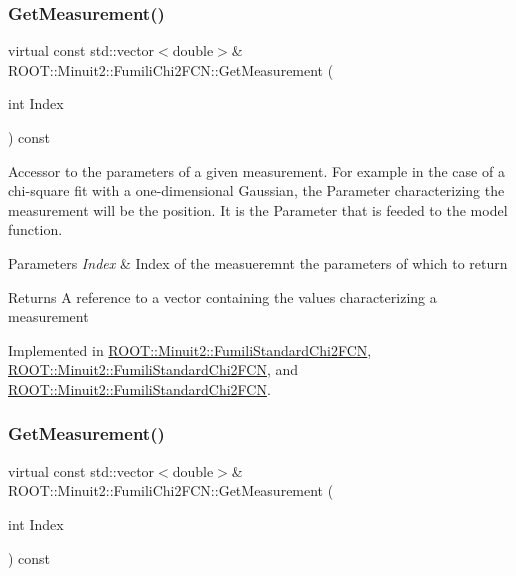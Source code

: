 \subsubsection{\texorpdfstring{GetMeasurement()}{GetMeasurement()}\hspace{0.1cm}{\footnotesize\ttfamily [2/3]}}
{\footnotesize\ttfamily virtual const std\+::vector$<$double$>$\& R\+O\+O\+T\+::\+Minuit2\+::\+Fumili\+Chi2\+F\+C\+N\+::\+Get\+Measurement (\begin{DoxyParamCaption}\item[{int}]{Index }\end{DoxyParamCaption}) const\hspace{0.3cm}{\ttfamily [pure virtual]}}

Accessor to the parameters of a given measurement. For example in the case of a chi-\/square fit with a one-\/dimensional Gaussian, the Parameter characterizing the measurement will be the position. It is the Parameter that is feeded to the model function.


\begin{DoxyParams}{Parameters}
{\em Index} & Index of the measueremnt the parameters of which to return \\
\hline
\end{DoxyParams}
\begin{DoxyReturn}{Returns}
A reference to a vector containing the values characterizing a measurement 
\end{DoxyReturn}


Implemented in \mbox{\hyperlink{classROOT_1_1Minuit2_1_1FumiliStandardChi2FCN_aed6181ee2996e090bc4aeb267771390e}{R\+O\+O\+T\+::\+Minuit2\+::\+Fumili\+Standard\+Chi2\+F\+CN}}, \mbox{\hyperlink{classROOT_1_1Minuit2_1_1FumiliStandardChi2FCN_a3bbc9a9cb77ce45aa764aa1f6e74349c}{R\+O\+O\+T\+::\+Minuit2\+::\+Fumili\+Standard\+Chi2\+F\+CN}}, and \mbox{\hyperlink{classROOT_1_1Minuit2_1_1FumiliStandardChi2FCN_a3bbc9a9cb77ce45aa764aa1f6e74349c}{R\+O\+O\+T\+::\+Minuit2\+::\+Fumili\+Standard\+Chi2\+F\+CN}}.

\mbox{\label{classROOT_1_1Minuit2_1_1FumiliChi2FCN_a1831875c53596cd4aa52ea536de53b60}} 
\subsubsection{\texorpdfstring{GetMeasurement()}{GetMeasurement()}\hspace{0.1cm}{\footnotesize\ttfamily [3/3]}}
{\footnotesize\ttfamily virtual const std\+::vector$<$double$>$\& R\+O\+O\+T\+::\+Minuit2\+::\+Fumili\+Chi2\+F\+C\+N\+::\+Get\+Measurement (\begin{DoxyParamCaption}\item[{int}]{Index }\end{DoxyParamCaption}) const\hspace{0.3cm}{\ttfamily [pure virtual]}}

